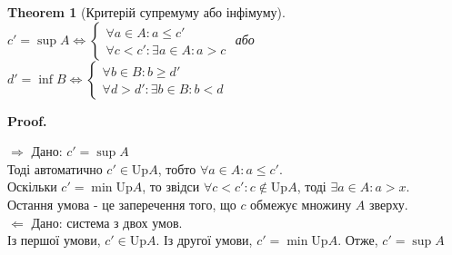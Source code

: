 \documentclass[a4paper, 14pt]{article}
\makeatletter
\def\qed{$\blacksquare$}
\def\rightproof{$\boxed{\Rightarrow}$ }
\def\leftproof{$\boxed{\Leftarrow}$ }
\theoremstyle{theoremdd}
\newtheorem{theorem}{Theorem}[subsection]
\theoremstyle{theoremdd}
\theoremstyle{theoremdd}
\theoremstyle{theoremdd}
\theoremstyle{theoremdd}
\theoremstyle{theoremdd}
\theoremstyle{theoremdd}
\theoremstyle{theoremdd}
\renewenvironment{proof}[1][Proof.\\]{\par
\pushQED{\hfill \qed}%
\normalfont \topsep6\p@\@plus6\p@\relax
\trivlist
\item\relax
{\bfseries
#1\@addpunct{.}}\hspace\labelsep\ignorespaces
}{%
\popQED\endtrivlist\@endpefalse
}
\makeatother
\begin{document}
	\begin{theorem}[Критерій супремуму або інфімуму]
		$c' = \sup A \iff \begin{cases}
	 \forall a \in A: a \leq c' \\
	 \forall c < c': \exists a \in A: a > c
	\end{cases}$ \hspace{0.1cm} або \hspace{0.1cm}
	$d' = \inf B \iff \begin{cases} 
	 \forall b \in B: b \geq d'\\
	 \forall d > d': \exists b \in B: b < d
	\end{cases}$
	\begin{figure}[H]
	\centering
	\qquad
	\end{figure}
	\end{theorem}
	
	\begin{proof}
	\rightproof Дано: $c' = \sup A$\\
	Тоді автоматично $c' \in \text{Up}A$, тобто $\forall a \in A: a \leq c'$.\\
	Оскільки $c' = \min \text{Up} A$, то звідси $\forall c < c': c \not\in \text{Up}A$, тоді $\exists a \in A: a > x$.\\
	Остання умова - це заперечення того, що $c$ обмежує множину $A$ зверху.
	\bigskip \\
	\leftproof Дано: система з двох умов.\\
	Із першої умови, $c' \in \text{Up}A$. Із другої умови, $c' = \min \text{Up} A$. Отже, $c' = \sup A$
	\end{proof}
	
\end{document}
